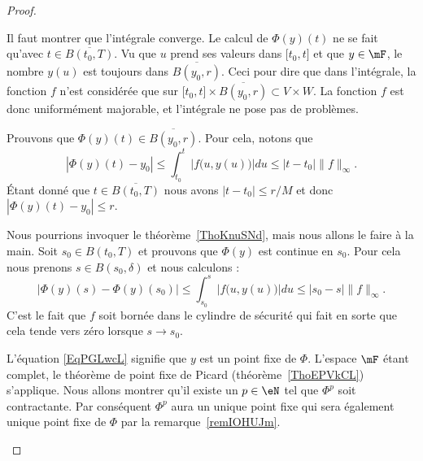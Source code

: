 \begin{proof}
\begin{subproof}
\begin{subproof}
			Il faut montrer que l'intégrale converge. Le calcul de \( \Phi(y)(t)\) ne se fait qu'avec \( t\in \overline{ B(t_0,T) }\). Vu que \( u\) prend ses valeurs dans \( \mathopen[ t_0 , t \mathclose]\) et que \( y\in\mF\), le nombre \( y(u)\) est toujours dans \( \overline{ B(y_0,r) }\). Ceci pour dire que dans l'intégrale, la fonction \( f\) n'est considérée que sur \( \mathopen[ t_0 , t \mathclose]\times \overline{ B(y_0,r) }\subset V\times W\). La fonction \( f\) est donc uniformément majorable, et l'intégrale ne pose pas de problèmes.


			Prouvons que \( \Phi(y)(t)\in\overline{ B(y_0,r) }\). Pour cela, notons que
			\begin{equation}
				| \Phi(y)(t)-y_0 |\leq \int_{t_0}^t |f\big( u,y(u) \big)|du\leq | t-t_0 |\| f \|_{\infty}.
			\end{equation}
			Étant donné que \( t\in\overline{ B(t_0,T) }\) nous avons \( | t-t_0 |\leq r/M\) et donc \( | \Phi(y)(t)-y_0 |\leq r\).


			Nous pourrions invoquer le théorème~\ref{ThoKnuSNd}, mais nous allons le faire à la main. Soit \( s_0\in B(t_0,T)\) et prouvons que \( \Phi(y)\) est continue en \( s_0\). Pour cela nous prenons \( s\in B(s_0,\delta)\) et nous calculons :
			\begin{equation}
				| \Phi(y)(s)-\Phi(y)(s_0) |\leq \int_{s_0}^s|f\big( u,y(u) \big)|du\leq | s_0-s |\| f \|_{\infty}.
			\end{equation}
			C'est le fait que \( f\) soit bornée dans le cylindre de sécurité qui fait en sorte que cela tende vers zéro lorsque \( s\to s_0\).
		\end{subproof}

		L'équation \eqref{EqPGLwcL} signifie que \( y\) est un point fixe de \( \Phi\). L'espace \( \mF\) étant complet, le théorème de point fixe de Picard (théorème~\ref{ThoEPVkCL}) s'applique. Nous allons montrer qu'il existe un \( p\in\eN\) tel que \( \Phi^p\) soit contractante. Par conséquent \( \Phi^p\) aura un unique point fixe qui sera également unique point fixe de \( \Phi\) par la remarque~\ref{remIOHUJm}.

		\spitem[Contractante]


\end{subproof}
\end{proof}
